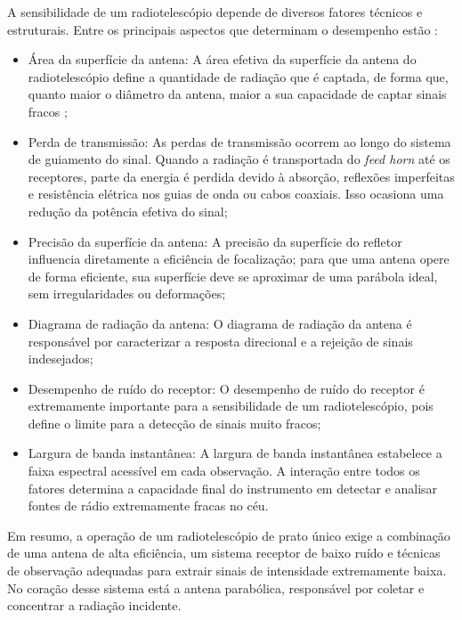 A sensibilidade de um radiotelescópio depende de diversos fatores técnicos e estruturais. Entre os principais aspectos que determinam o desempenho estão \cite{cheng2009telescope_Desing}:
\begin{itemize}
\item Área da superfície da antena: A área efetiva da superfície da antena do radiotelescópio define a quantidade de radiação que é captada, de forma que, quanto maior o diâmetro da antena, maior a sua capacidade de captar sinais fracos \cite{ramalho2023impactos};


\item Perda de transmissão: As perdas de transmissão ocorrem ao longo do sistema de guiamento do sinal. Quando a radiação é transportada do \textit{feed horn} até os receptores, parte da energia é perdida devido à absorção, reflexões imperfeitas e resistência elétrica nos guias de onda ou cabos coaxiais. Isso ocasiona uma redução da potência efetiva do sinal;

\item Precisão da superfície da antena: A precisão da superfície do refletor influencia diretamente a eficiência de focalização; para que uma antena opere de forma eficiente, sua superfície deve se aproximar de uma parábola ideal, sem irregularidades ou deformações;

\item Diagrama de radiação da antena: O diagrama de radiação da antena é responsável por caracterizar a resposta direcional e a rejeição de sinais indesejados;

\item Desempenho de ruído do receptor: O desempenho de ruído do receptor é extremamente importante para a sensibilidade de um radiotelescópio, pois define o limite para a detecção de sinais muito fracos;

\item Largura de banda instantânea: A largura de banda instantânea estabelece a faixa espectral acessível em cada observação. A interação entre todos os fatores determina a capacidade final do instrumento em detectar e analisar fontes de rádio extremamente fracas no céu.

\end{itemize}

Em resumo, a operação de um radiotelescópio de prato único exige a combinação de uma antena de alta eficiência, um sistema receptor de baixo ruído e técnicas de observação adequadas para extrair sinais de intensidade extremamente baixa. No coração desse sistema está a antena parabólica, responsável por coletar e concentrar a radiação incidente.

